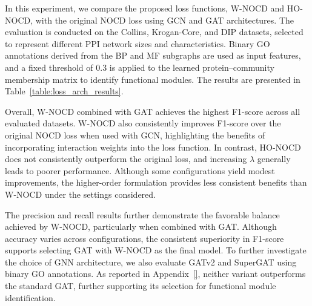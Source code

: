 In this experiment, we compare the proposed loss functions, W-NOCD and HO-NOCD, with the original NOCD loss using GCN and GAT architectures. The evaluation is conducted on the Collins, Krogan-Core, and DIP datasets, selected to represent different PPI network sizes and characteristics. Binary GO annotations derived from the BP and MF subgraphs are used as input features, and a fixed threshold of $0.3$ is applied to the learned protein–community membership matrix to identify functional modules. The results are presented in Table~\ref{table:loss_arch_results}.

Overall, W-NOCD combined with GAT achieves the highest F1-score across all evaluated datasets. W-NOCD also consistently improves F1-score over the original NOCD loss when used with GCN, highlighting the benefits of incorporating interaction weights into the loss function. In contrast, HO-NOCD does not consistently outperform the original loss, and increasing $\lambda$ generally leads to poorer performance. Although some configurations yield modest improvements, the higher-order formulation provides less consistent benefits than W-NOCD under the settings considered.

The precision and recall results further demonstrate the favorable balance achieved by W-NOCD, particularly when combined with GAT. Although accuracy varies across configurations, the consistent superiority in F1-score supports selecting GAT with W-NOCD as the final model. To further investigate the choice of GNN architecture, we also evaluate GATv2 and SuperGAT using binary GO annotations. As reported in Appendix~\ref{}, neither variant outperforms the standard GAT, further supporting its selection for functional module identification.


